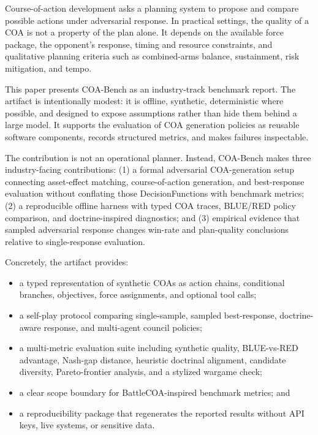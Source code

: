 \documentclass[sigconf]{acmart}
\begin{document}
Course-of-action development asks a planning system to propose and compare possible actions under adversarial response. In practical settings, the quality of a COA is not a property of the plan alone. It depends on the available force package, the opponent's response, timing and resource constraints, and qualitative planning criteria such as combined-arms balance, sustainment, risk mitigation, and tempo.

This paper presents COA-Bench as an industry-track benchmark report. The artifact is intentionally modest: it is offline, synthetic, deterministic where possible, and designed to expose assumptions rather than hide them behind a large model. It supports the evaluation of COA generation policies as reusable software components, records structured metrics, and makes failures inspectable.

The contribution is not an operational planner. Instead, COA-Bench makes three industry-facing contributions: (1) a formal adversarial COA-generation setup connecting asset-effect matching, course-of-action generation, and best-response evaluation without conflating those DecisionFunctions with benchmark metrics; (2) a reproducible offline harness with typed COA traces, BLUE/RED policy comparison, and doctrine-inspired diagnostics; and (3) empirical evidence that sampled adversarial response changes win-rate and plan-quality conclusions relative to single-response evaluation.

Concretely, the artifact provides:

\begin{itemize}
  \item a typed representation of synthetic COAs as action chains, conditional branches, objectives, force assignments, and optional tool calls;
  \item a self-play protocol comparing single-sample, sampled best-response, doctrine-aware response, and multi-agent council policies;
  \item a multi-metric evaluation suite including synthetic quality, BLUE-vs-RED advantage, Nash-gap distance, heuristic doctrinal alignment, candidate diversity, Pareto-frontier analysis, and a stylized wargame check;
  \item a clear scope boundary for BattleCOA-inspired benchmark metrics; and
  \item a reproducibility package that regenerates the reported results without API keys, live systems, or sensitive data.
\end{itemize}
\end{document}
